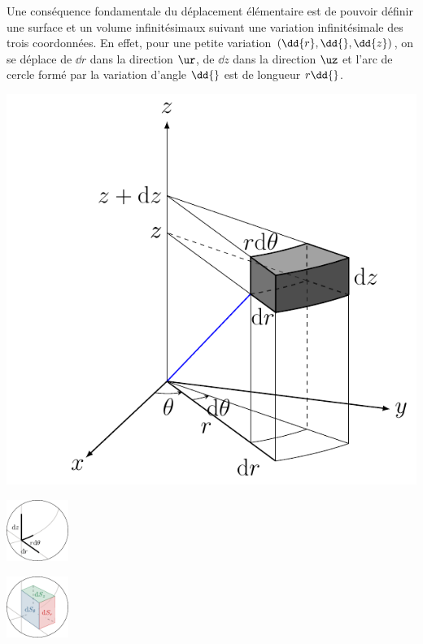 \documentclass[../../main/main.tex]{subfiles}
\begin{document}
\noindent
\begin{minipage}{0.48\linewidth}
	Une conséquence fondamentale du déplacement élémentaire est de pouvoir définir
	une surface et un volume infinitésimaux suivant une variation infinitésimale
	des trois coordonnées.
	\smallbreak
	En effet, pour une petite variation $(\dd{r}, \dd{\tt}, \dd{z})$,
	on se déplace de $\dd{r}$ dans la direction $\ur$, de $\dd{z}$ dans la
	direction $\uz$ et l'arc de cercle formé par la variation d'angle $\dd{\tt}$
	est de longueur $r\dd{\tt}$.
\end{minipage}
\hfill
\begin{minipage}{0.25\linewidth}
	\begin{center}
		\includegraphics[width=\linewidth]{cyl_vol}
		\captionsetup{justification=centering}
	\end{center}
\end{minipage}
\begin{minipage}{0.25\linewidth}
	\begin{center}
		\includegraphics[height=2cm]{zoom_cyl_lgn}
	\end{center}
	\begin{center}
		\includegraphics[height=2cm]{zoom_cyl_sfc}
		\captionsetup{justification=centering}
	\end{center}
\end{minipage}
\end{document}
